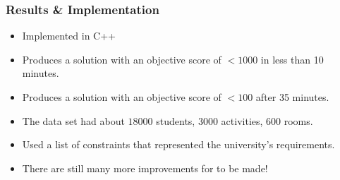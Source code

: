\documentclass{beamer}
\begin{document}
\begin{frame}
	\frametitle{Results \& Implementation}
	
	\begin{itemize}
		\item Implemented in C++
		\item Produces a solution with an objective score of $< 1000$ in less than 10 minutes.
		\item Produces a solution with an objective score of $< 100$ after 35 minutes.
		\item The data set had about $18000$ students, $3000$ activities, $600$ rooms.
		\item Used a list of constraints that represented the university's requirements.
		
		\item There are still many more improvements for to be made!
	\end{itemize}
\end{frame}
\end{document}
